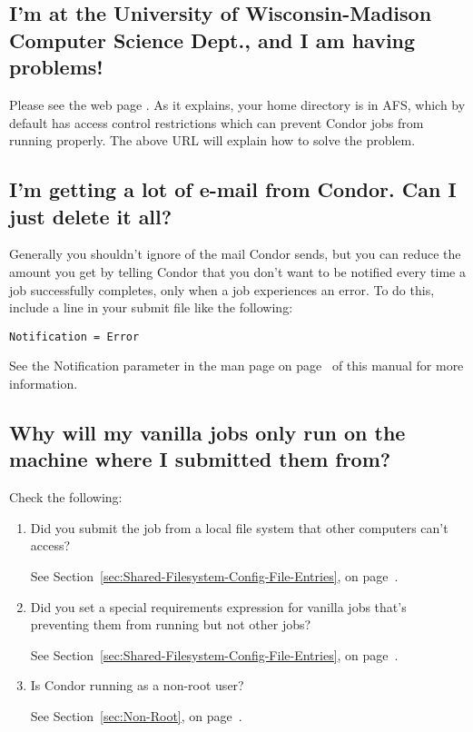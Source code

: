 \subsection*{I'm at the University of Wisconsin-Madison Computer Science Dept., and I am having problems!}

Please see the web page .
As
it explains, your home directory is in AFS, which by default has
access control restrictions which can prevent Condor jobs from running
properly.
The above URL will explain how to solve the problem.

\subsection*{I'm getting a lot of e-mail from Condor.  Can I just delete it all?}

Generally you shouldn't ignore  of the mail Condor sends,
but you can reduce the amount you get by telling Condor that you don't
want to be notified every time a job successfully completes, only when
a job experiences an error.
To do this, include a line in your submit file like the following:

\begin{verbatim}
Notification = Error
\end{verbatim}

See the Notification parameter in the  man page on
page~\pageref{man-condor-submit-notification} of this manual for more
information.

\subsection*{Why will my vanilla jobs only run on the machine where I submitted them from?}

Check the following:
\begin {enumerate}

\item{Did you submit the job from a local file system that other
computers can't access?}

See Section~\ref{sec:Shared-Filesystem-Config-File-Entries}, on
page~\pageref{sec:Shared-Filesystem-Config-File-Entries}.

\item{Did you set a special requirements expression for 
vanilla jobs that's preventing them from running but not other jobs?}

See Section~\ref{sec:Shared-Filesystem-Config-File-Entries}, on
page~\pageref{sec:Shared-Filesystem-Config-File-Entries}.

\item{Is Condor running as a non-root user?}

See Section~\ref{sec:Non-Root}, on page~\pageref{sec:Non-Root}.

\end{enumerate}

